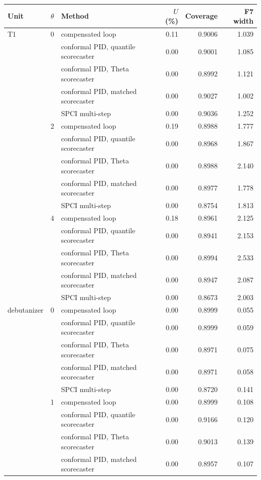 \begin{tabular}{@{}lrlrrr@{}}
\toprule
Unit & $\theta$ & Method & $U$ (\%) & Coverage & F7 width \\
\midrule
T1 & 0 & compensated loop & 0.11 & 0.9006 & 1.039 \\
 &  & conformal PID, quantile scorecaster & 0.00 & 0.9001 & 1.085 \\
 &  & conformal PID, Theta scorecaster & 0.00 & 0.8992 & 1.121 \\
 &  & conformal PID, matched scorecaster & 0.00 & 0.9027 & 1.002 \\
 &  & SPCI multi-step & 0.00 & 0.9036 & 1.252 \\
\addlinespace
 & 2 & compensated loop & 0.19 & 0.8988 & 1.777 \\
 &  & conformal PID, quantile scorecaster & 0.00 & 0.8968 & 1.867 \\
 &  & conformal PID, Theta scorecaster & 0.00 & 0.8988 & 2.140 \\
 &  & conformal PID, matched scorecaster & 0.00 & 0.8977 & 1.778 \\
 &  & SPCI multi-step & 0.00 & 0.8754 & 1.813 \\
\addlinespace
 & 4 & compensated loop & 0.18 & 0.8961 & 2.125 \\
 &  & conformal PID, quantile scorecaster & 0.00 & 0.8941 & 2.153 \\
 &  & conformal PID, Theta scorecaster & 0.00 & 0.8994 & 2.533 \\
 &  & conformal PID, matched scorecaster & 0.00 & 0.8947 & 2.087 \\
 &  & SPCI multi-step & 0.00 & 0.8673 & 2.003 \\
\addlinespace
debutanizer & 0 & compensated loop & 0.00 & 0.8999 & 0.055 \\
 &  & conformal PID, quantile scorecaster & 0.00 & 0.8999 & 0.059 \\
 &  & conformal PID, Theta scorecaster & 0.00 & 0.8971 & 0.075 \\
 &  & conformal PID, matched scorecaster & 0.00 & 0.8971 & 0.058 \\
 &  & SPCI multi-step & 0.00 & 0.8720 & 0.141 \\
\addlinespace
 & 1 & compensated loop & 0.00 & 0.8999 & 0.108 \\
 &  & conformal PID, quantile scorecaster & 0.00 & 0.9166 & 0.120 \\
 &  & conformal PID, Theta scorecaster & 0.00 & 0.9013 & 0.139 \\
 &  & conformal PID, matched scorecaster & 0.00 & 0.8957 & 0.107 \\

\end{tabular}
